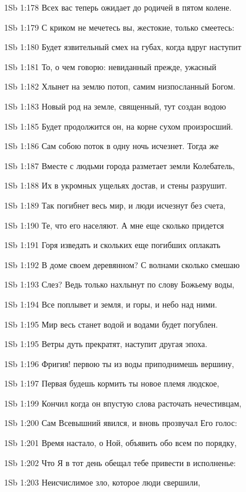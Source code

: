 \vs 1Sb 1:178 Всех вас теперь ожидает до родичей в пятом колене.

\vs 1Sb 1:179 С криком не мечетесь вы, жестокие, только смеетесь:

\vs 1Sb 1:180 Будет язвительный смех на губах, когда вдруг наступит

\vs 1Sb 1:181 То, о чем говорю: невиданный прежде, ужасный

\vs 1Sb 1:182 Хлынет на землю потоп, самим низпосланный Богом.

\vs 1Sb 1:183 Новый род на земле, священный, тут создан водою

\vs 1Sb 1:185 Будет  продолжится он, на корне сухом произросший.

\vs 1Sb 1:186 Сам собою поток в одну ночь исчезнет. Тогда же

\vs 1Sb 1:187 Вместе с людьми города разметает земли Колебатель,

\vs 1Sb 1:188 Их в укромных ущельях достав, и стены разрушит.

\vs 1Sb 1:189 Так погибнет весь мир, и люди исчезнут без счета,

\vs 1Sb 1:190 Те, что его населяют. А мне еще сколько придется

\vs 1Sb 1:191 Горя изведать и скольких еще погибших оплакать

\vs 1Sb 1:192 В доме своем деревянном? С волнами сколько смешаю

\vs 1Sb 1:193 Слез? Ведь только нахлынут по слову Божьему воды,

\vs 1Sb 1:194 Все поплывет  и земля, и горы, и небо над ними.

\vs 1Sb 1:195 Мир весь станет водой и водами будет погублен.

\vs 1Sb 1:195 Ветры дуть прекратят, наступит другая эпоха.

\vs 1Sb 1:196 Фригия! первою ты из воды приподнимешь вершину,

\vs 1Sb 1:197 Первая будешь кормить ты новое племя людское,

\vs 1Sb 1:199 Кончил когда он впустую слова расточать нечестивцам,

\vs 1Sb 1:200 Сам Всевышний явился, и вновь прозвучал Его голос:

\vs 1Sb 1:201 Время настало, о Ной, объявить обо всем по порядку,

\vs 1Sb 1:202 Что Я в тот день обещал тебе привести в исполненье:

\vs 1Sb 1:203 Неисчислимое зло, которое люди свершили,

